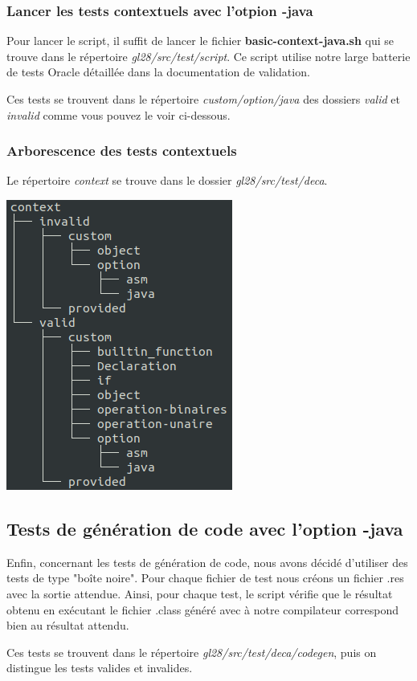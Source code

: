 \documentclass[12pt, a4paper, one side]{article}
\begin{document}
    \subsubsection{Lancer les tests contextuels avec l'otpion -java}
    Pour lancer le script, il suffit de lancer le fichier \textbf{basic-context-java.sh} qui se trouve dans le répertoire \textit{gl28/src/test/script}. Ce script utilise notre large batterie de tests Oracle détaillée dans la documentation de validation.
    \begin{flushleft}
        Ces tests se trouvent dans le répertoire \textit{custom/option/java} des dossiers \textit{valid} et \textit{invalid} comme vous pouvez le voir ci-dessous.
    \end{flushleft}

    \subsubsection{Arborescence des tests contextuels}
    Le répertoire \textit{context} se trouve dans le dossier \textit{gl28/src/test/deca}.
    \begin{center}
        \includegraphics[scale=0.7]{treecontext.png}
    \end{center}


    \subsection{Tests de génération de code avec l'option -java}
    Enfin, concernant les tests de génération de code, nous avons décidé d'utiliser des tests de type "boîte noire". Pour chaque fichier de test nous créons un fichier .res avec la sortie attendue. Ainsi, pour chaque test, le script vérifie que le résultat obtenu en exécutant le fichier .class généré avec à notre compilateur correspond bien au résultat attendu.
    \begin{flushleft}
        Ces tests se trouvent dans le répertoire \textit{gl28/src/test/deca/codegen}, puis on distingue les tests valides et invalides.
    \end{flushleft}
\end{document}
